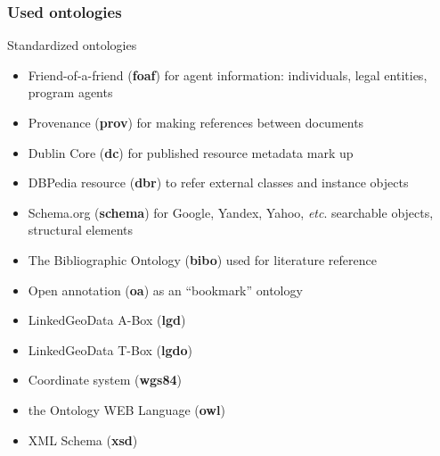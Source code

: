 \documentclass[10pt]{beamer}
\begin{document}
\begin{frame}
  \frametitle{Used ontologies}

  Standardized ontologies

  \begin{itemize}
  \item Friend-of-a-friend (\textbf{foaf}) for agent information: individuals, legal entities, program agents
  \item Provenance (\textbf{prov}) for making references between documents
  \item Dublin Core (\textbf{dc}) for published resource metadata mark up
  \item DBPedia resource (\textbf{dbr}) to refer external classes and instance objects
  \item Schema.org (\textbf{schema}) for Google, Yandex, Yahoo, \emph{etc}. searchable objects, structural elements
  \item The Bibliographic Ontology (\textbf{bibo}) used for literature reference
  \item Open annotation (\textbf{oa}) as an ``bookmark'' ontology
  \item LinkedGeoData A-Box (\textbf{lgd}) %
  \item LinkedGeoData T-Box (\textbf{lgdo}) %
  \item Coordinate system (\textbf{wgs84}) %
  \item the Ontology WEB Language (\textbf{owl}) %
  \item XML Schema (\textbf{xsd}) %
  \end{itemize}


\end{frame}
\end{document}
